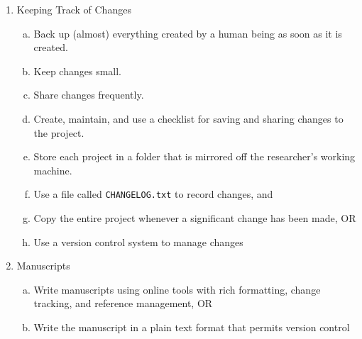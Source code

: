 \documentclass[10pt,letterpaper]{article}
\begin{document}
{\begin{enumerate}
\begin{enumerate}[a)]
  \item Put each project in its own directory, which is named after the project.
  \item Put text documents associated with the project in the \texttt{doc} directory.
  \item Put raw data and metadata in a \texttt{data} directory, and files generated during cleanup and analysis in a \texttt{results} directory.
  \item Put project source code in the \texttt{src} directory.
  \item Put external scripts, or compiled programs in the \texttt{bin} directory.
  \item Name all files to reflect their content or function.
  \end{enumerate}
\item Keeping Track of Changes
  \begin{enumerate}[a)]
  \item Back up (almost) everything created by a human being as soon as it is created.
  \item Keep changes small.
  \item Share changes frequently.
  \item Create, maintain, and use a checklist for saving and sharing changes to the project.
  \item Store each project in a folder that is mirrored off the researcher's working machine.
   \item Use a file called \texttt{CHANGELOG.txt} to record changes, and
   \item Copy the entire project whenever a significant change has been made, OR
   \item Use a version control system to manage changes 
  \end{enumerate}
\item Manuscripts
  \begin{enumerate}[a)]
  \item Write manuscripts using online tools with rich formatting, change tracking, and reference management, OR
  \item Write the manuscript in a plain text format that permits version control
  \end{enumerate}
\end{enumerate}
}
\end{document}
